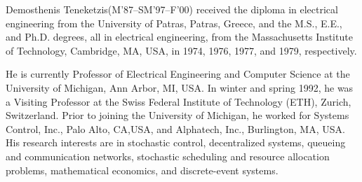 \documentclass[onecolumn,draftcls]{IEEEtran}
\begin{document}
\begin{IEEEbiographynophoto}{Demosthenis Teneketzis}(M'87--SM'97--F'00)
received the diploma in electrical engineering from the University of Patras, Patras, Greece, and the M.S.,
E.E., and Ph.D. degrees, all in electrical engineering, from the Massachusetts Institute of Technology,
Cambridge, MA, USA, in 1974, 1976, 1977, and 1979, respectively.

He is currently Professor of Electrical Engineering and Computer Science at the University of Michigan,
Ann Arbor, MI, USA. In winter and spring 1992, he was a Visiting Professor at the Swiss Federal Institute
of Technology (ETH), Zurich, Switzerland. Prior to joining the University of Michigan, he worked for Systems Control, Inc., Palo Alto, CA,USA, and Alphatech, Inc., Burlington, MA, USA.
His research interests are in stochastic control, decentralized systems, queueing and communication networks, stochastic scheduling and resource allocation problems, mathematical economics, and discrete-event systems.
\end{IEEEbiographynophoto}
\end{document}
